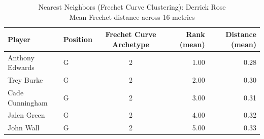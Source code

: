 \begin{table}[t]
\caption*{
{\fontsize{20}{25} Nearest Neighbors (Frechet Curve Clustering): Derrick Rose\fontsize{12}{15}\selectfont } \\ 
{\fontsize{14}{17}\selectfont  Mean Frechet distance across 16 metrics\fontsize{12}{15}\selectfont }
} 
\fontsize{12.0pt}{14.0pt}\selectfont
\begin{tabular*}{\linewidth}{@{\extracolsep{\fill}}llcrr}
\toprule
Player & Position & Frechet Curve Archetype & Rank (mean) & Distance (mean) \\ 
\midrule\addlinespace[2.5pt]
Anthony Edwards & G & 2 & 1.00 & 0.28 \\ 
Trey Burke & G & 2 & 2.00 & 0.30 \\ 
Cade Cunningham & G & 2 & 3.00 & 0.31 \\ 
Jalen Green & G & 2 & 4.00 & 0.32 \\ 
John Wall & G & 2 & 5.00 & 0.33 \\ 
\bottomrule
\end{tabular*}
\end{table}

